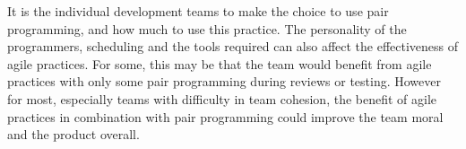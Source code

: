 \documentclass{scrartcl}
\begin{document}
It is the individual development teams to make the choice to use pair programming, and how much to use this practice. The personality of the programmers, scheduling and the tools required can also affect the effectiveness of agile practices. For some, this may be that the team would benefit from agile practices with only some pair programming during reviews or testing. However for most, especially teams with difficulty in team cohesion, the benefit of agile practices in combination with pair programming could improve the team moral and the product overall.



\end{document}
